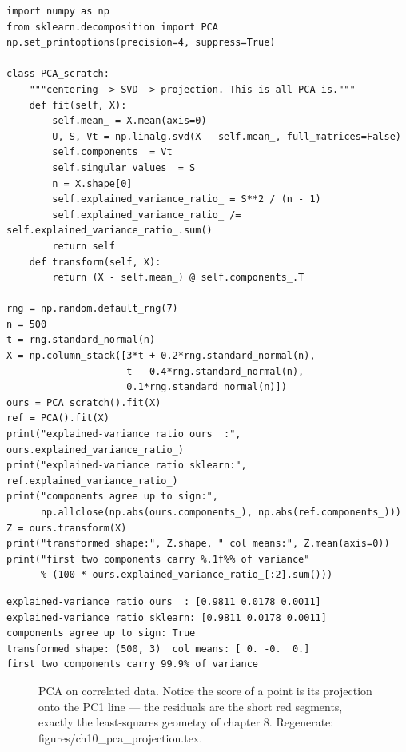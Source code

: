 \begin{lstlisting}[caption={\ttfamily code/ch10\_pca\_capstone.py ---
\texttt{mlscratch.PCA} vs.\ \texttt{sklearn.decomposition.PCA}: centering,
SVD, projection, variance report --- the whole algorithm.}]
import numpy as np
from sklearn.decomposition import PCA
np.set_printoptions(precision=4, suppress=True)

class PCA_scratch:
    """centering -> SVD -> projection. This is all PCA is."""
    def fit(self, X):
        self.mean_ = X.mean(axis=0)
        U, S, Vt = np.linalg.svd(X - self.mean_, full_matrices=False)
        self.components_ = Vt
        self.singular_values_ = S
        n = X.shape[0]
        self.explained_variance_ratio_ = S**2 / (n - 1)
        self.explained_variance_ratio_ /= self.explained_variance_ratio_.sum()
        return self
    def transform(self, X):
        return (X - self.mean_) @ self.components_.T

rng = np.random.default_rng(7)
n = 500
t = rng.standard_normal(n)
X = np.column_stack([3*t + 0.2*rng.standard_normal(n),
                     t - 0.4*rng.standard_normal(n),
                     0.1*rng.standard_normal(n)])
ours = PCA_scratch().fit(X)
ref = PCA().fit(X)
print("explained-variance ratio ours  :", ours.explained_variance_ratio_)
print("explained-variance ratio sklearn:", ref.explained_variance_ratio_)
print("components agree up to sign:",
      np.allclose(np.abs(ours.components_), np.abs(ref.components_)))
Z = ours.transform(X)
print("transformed shape:", Z.shape, " col means:", Z.mean(axis=0))
print("first two components carry %.1f%% of variance"
      % (100 * ours.explained_variance_ratio_[:2].sum()))
\end{lstlisting}

\begin{lstlisting}[caption={Output of the PCA capstone. Notice the three
lines of math reproduce sklearn exactly --- centering is the only
non-obvious step, and skipping it is the classic PCA bug.}]
explained-variance ratio ours  : [0.9811 0.0178 0.0011]
explained-variance ratio sklearn: [0.9811 0.0178 0.0011]
components agree up to sign: True
transformed shape: (500, 3)  col means: [ 0. -0.  0.]
first two components carry 99.9% of variance
\end{lstlisting}

\begin{figure}[htbp]
\centering

\caption{PCA on correlated data. Notice the score of a point is its
projection onto the PC1 line --- the residuals are the short red
segments, exactly the least-squares geometry of chapter 8.
Regenerate: \ttfamily figures/ch10\_pca\_projection.tex.}
\label{fig:pcaproj}
\end{figure}

